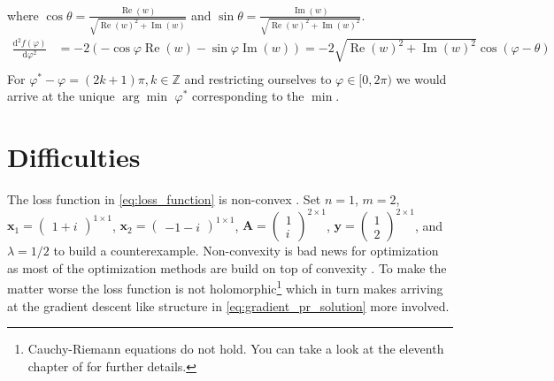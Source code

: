 \begin{Proof}
\begin{equation}
\begin{split}
				\end{split}
			  \end{equation}
			  where $\cos\theta = \frac{\operatorname{Re}(w)}{\sqrt{\operatorname{Re}(w)^2+\operatorname{Im}(w)}}$ and $\sin\theta = \frac{\operatorname{Im}(w)}{\sqrt{\operatorname{Re}(w)^2+\operatorname{Im}(w)^2}}$.
			  \begin{equation}
				\begin{split}
				\frac{\mathrm{d}^2f(\varphi)}{\mathrm{d}\varphi^2} &= - 2\left(-\cos\varphi\operatorname{Re}(w)-\sin\varphi\operatorname{Im}(w)\right) = -2\sqrt{\operatorname{Re}(w)^2+\operatorname{Im}(w)^2}\cos(\varphi-\theta)\\ 
				\end{split}
			  \end{equation}
        For $\varphi^\ast-\varphi = (2k+1)\pi, k \in \mathbb{Z}$ and restricting ourselves to $\varphi \in [0,2\pi)$ we would arrive at the unique $\arg\min$ $\varphi^*$ corresponding to the $\min$.
		\end{Proof}


  
\section{Difficulties}

The loss function in \cref{eq:loss_function} is non-convex \cite{Candes2014}. Set $n=1$, $m=2$, $\boldsymbol{x}_1 = \begin{pmatrix}1+i\end{pmatrix}^{1 \times 1}$, 
$\boldsymbol{x}_2 = \begin{pmatrix}-1-i\end{pmatrix}^{1 \times 1}$, $\boldsymbol{A}=\begin{pmatrix}1\\i \end{pmatrix}^{2 \times 1}$, 
$\boldsymbol{y}=\begin{pmatrix}1\\2 \end{pmatrix}^{2 \times 1}$, and $\lambda=1/2$ to build a counterexample. Non-convexity is bad news for 
optimization as most of the optimization methods are build on top of convexity \cite{Boyd2004}\cite{Nocedal2006}. To make the matter worse the loss function is not 
holomorphic\footnote{Cauchy-Riemann equations do not hold. You can take a look at the eleventh chapter of \cite{Rudin1987} for further details.} 
which in turn makes arriving at the gradient descent like structure in \cref{eq:gradient_pr_solution} more involved.

